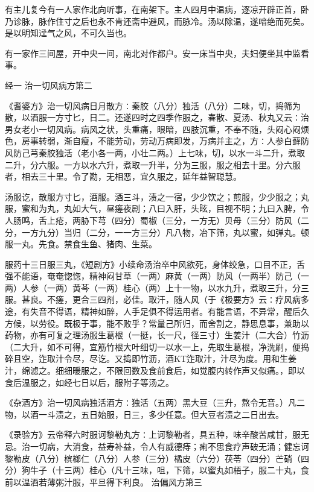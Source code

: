 \documentclass[a4paper,12pt,UTF8,twoside]{ctexbook}
\begin{document}
有主儿复今有一人家作北向听事，在南架下。主人四月中温病，逐凉开辟正首，卧乃诊脉，脉作住寸之后也永不肯还斋中避风，而脉冷。汤以除温，遂喑绝而死矣。是以明知迳气之风，不可久当也。

有一家作三间屋，开中央一间，南北对作都户。安一床当中央，夫妇便坐其中监看事。

经一
治一切风病方第二

《耆婆方》治一切风病日月散方∶秦胶（八分）独活（八分）二味，切，捣筛为散，以酒服一方寸匕，日二。还遂四时之四季作服之，春散、夏汤、秋丸又云∶治男女老小一切风病。病风之状，头重痛，眼暗，四肢沉重，不奉不随，头闷心闷烦色，房事转弱，渐自瘦，不能劳动，劳动万病即发，万病并主之，方∶人参白藓防风防己芎秦胶独活（老小各一两，小壮二两。）上七味，切，以水一斗二升，煮取二升，分六服。一方以水六升，煮取一升半，分为三服，服之相去十里。分六服者，相去三十里。令了勘，无相恶，宜久服之，延年益智聪慧。

汤服讫，散服方寸匕，酒服。酒三斗，渍之一宿，少少饮之；煎服，少少服之；丸服，蜜和为丸，丸如大气，昼瘥夜剧；八曰入肝，头眩，目视不明；九曰入脾，令人肠鸣，舌上疮，两胁下芎（四分）蜀椒（三分，一方无）贝母（三分）防风（二分，一方九分）当归（二分，一一方三分）凡八物，冶下筛，丸以蜜，如弹丸。顿服一丸。先食。禁食生鱼、猪肉、生菜。

服药十三日服三丸，《短剧方》小续命汤治卒中风欲死，身体绞急，口目不正，舌强不能语，奄奄惚惚，精神闷甘草（一两）麻黄（一两）防风（一两半）防己（一两）人参（一两）黄芩（一两）桂心（两）上十一物，以水九升，煮取三升，分三服。甚良。不瘥，更合三四剂，必佳。取汗，随人风（于《极要方》云∶疗风病多途，有失音不得语，精神如醉，人手足俱不得运用者。有能言语，不异常，醒后久方候，以劳役。既极于事，能不败乎？常量己所归，而舍割之，静思息事，兼助以药物，亦有可复之理汤服生葛根（一挺，长一尺，径三寸）生姜汁（二大合）竹沥（二大升，如不可得，宜筋竹根大叶细切一以水一上，先取生葛根，净洗刷，便捣碎且空，迮取汁令尽，尽讫。又捣即竹沥，酒KT迮取汁，汁尽为度。用和生姜汁，绵滤之。细细暖服之，不限回数及食前食后，如觉腹内转作声又似痛。，即以食后温服之，如经七日以后，服附子等汤之。

《杂酒方》治一切风病独活酒方∶独活（五两）黑大豆（三升，熬令无音。）凡二物，以酒一斗渍之，五日始服，日三，多少任意。但大豆者渍之二日出去。

《录验方》云帝释六时服诃黎勒丸方∶上诃黎勒者，具五种，味辛酸苦咸甘，服无忌。治一切病，大消食，益寿补益，令人有威德痔；痢不思食疗声破无涌；健忘诃黎勒皮（八分）槟榔仁（八分）人参（三分）橘皮（六分）茯苓（四分）芒硝（四分）狗牛子（十三两）桂心（凡十三味，咀，下筛，以蜜丸如梧子，服二十丸，食前以温酒若薄粥汁服，平旦得下利良。
治偏风方第三
\end{document}
